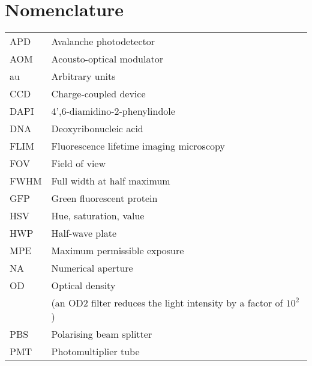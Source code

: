 \chapter{Nomenclature}

\begin{tabular}{ll}
	APD       & Avalanche photodetector                                             \\
	AOM       & Acousto-optical modulator                                           \\
	au        & Arbitrary units                                                     \\
	CCD       & Charge-coupled device                                               \\
	DAPI      & 4',6-diamidino-2-phenylindole                                       \\
	DNA       & Deoxyribonucleic acid                                               \\ %
	FLIM      & Fluorescence lifetime imaging microscopy                            \\
	FOV       & Field of view                                                       \\
	FWHM      & Full width at half maximum                                          \\
	GFP       & Green fluorescent protein                                           \\
	HSV       & Hue, saturation, value                                              \\
	HWP       & Half-wave plate                                                     \\
	MPE       & Maximum permissible exposure                                        \\
	NA        & Numerical aperture                                                  \\
	OD        & Optical density                                                     \\
	          & (an OD2 filter reduces the light intensity by a factor of $ 10^2 $) \\
	PBS       & Polarising beam splitter                                            \\
	PMT       & Photomultiplier tube                                                \\

\end{tabular}
